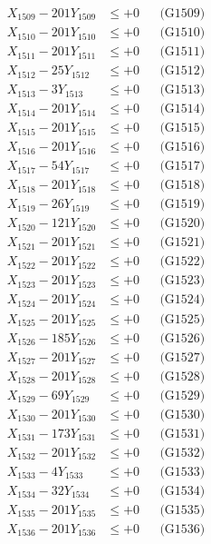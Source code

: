 \documentclass[a4paper,10pt]{article}
\begin{document}
{\begin{align}
X_{1509} - 201Y_{1509} &\leq +0 && \text{(G1509)} \\
X_{1510} - 201Y_{1510} &\leq +0 && \text{(G1510)} \\
\allowbreak
X_{1511} - 201Y_{1511} &\leq +0 && \text{(G1511)} \\
X_{1512} - 25Y_{1512} &\leq +0 && \text{(G1512)} \\
X_{1513} - 3Y_{1513} &\leq +0 && \text{(G1513)} \\
X_{1514} - 201Y_{1514} &\leq +0 && \text{(G1514)} \\
X_{1515} - 201Y_{1515} &\leq +0 && \text{(G1515)} \\
X_{1516} - 201Y_{1516} &\leq +0 && \text{(G1516)} \\
X_{1517} - 54Y_{1517} &\leq +0 && \text{(G1517)} \\
X_{1518} - 201Y_{1518} &\leq +0 && \text{(G1518)} \\
X_{1519} - 26Y_{1519} &\leq +0 && \text{(G1519)} \\
X_{1520} - 121Y_{1520} &\leq +0 && \text{(G1520)} \\
\allowbreak
X_{1521} - 201Y_{1521} &\leq +0 && \text{(G1521)} \\
X_{1522} - 201Y_{1522} &\leq +0 && \text{(G1522)} \\
X_{1523} - 201Y_{1523} &\leq +0 && \text{(G1523)} \\
X_{1524} - 201Y_{1524} &\leq +0 && \text{(G1524)} \\
X_{1525} - 201Y_{1525} &\leq +0 && \text{(G1525)} \\
X_{1526} - 185Y_{1526} &\leq +0 && \text{(G1526)} \\
X_{1527} - 201Y_{1527} &\leq +0 && \text{(G1527)} \\
X_{1528} - 201Y_{1528} &\leq +0 && \text{(G1528)} \\
X_{1529} - 69Y_{1529} &\leq +0 && \text{(G1529)} \\
X_{1530} - 201Y_{1530} &\leq +0 && \text{(G1530)} \\
\allowbreak
X_{1531} - 173Y_{1531} &\leq +0 && \text{(G1531)} \\
X_{1532} - 201Y_{1532} &\leq +0 && \text{(G1532)} \\
X_{1533} - 4Y_{1533} &\leq +0 && \text{(G1533)} \\
X_{1534} - 32Y_{1534} &\leq +0 && \text{(G1534)} \\
X_{1535} - 201Y_{1535} &\leq +0 && \text{(G1535)} \\
X_{1536} - 201Y_{1536} &\leq +0 && \text{(G1536)} \\

\end{align}}
\end{document}
